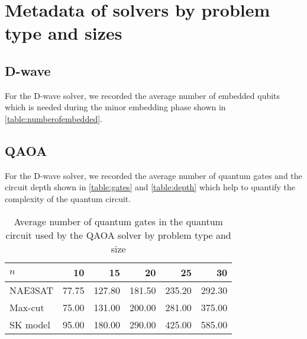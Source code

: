 \chapter{Metadata of solvers by problem type and sizes}\label{appendix:metadata}

\section{D-wave}
For the D-wave solver, we recorded the average number of embedded qubits which is needed during the minor embedding phase shown in \autoref{table:numberofembedded}.

\begin{table}[!ht]
    \centering
    \caption{Average number of embedded qubits for the D-wave solver by problem type and size}
    \label{table:numberofembedded}
\end{table}

\section{QAOA}
For the D-wave solver, we recorded the average number of quantum gates and the circuit depth shown in \autoref{table:gates} and \autoref{table:depth} which help to quantify the complexity of the quantum circuit.

\begin{table}[!ht]
    \centering
    \begin{tabular}{lrrrrr} \toprule
        $n$ & 10 & 15 & 20 & 25 & 30\\ \midrule
        NAE3SAT & 77.75 & 127.80 & 181.50 & 235.20 & 292.30 \\
        Max-cut & 75.00 & 131.00 & 200.00 & 281.00 & 375.00 \\
        SK model & 95.00 & 180.00 & 290.00 & 425.00 & 585.00\\ \bottomrule
    \end{tabular}
    \caption{Average number of quantum gates in the quantum circuit used by the QAOA solver by problem type and size}
    \label{table:gates}
\end{table}

